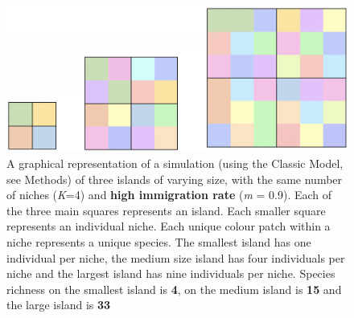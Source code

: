 \begin{figure}[htp]

\centering
\includegraphics[width=.5\textwidth]{HighImIslands.png}\hfill


\caption{A graphical representation of a simulation (using the Classic Model, see Methods) of three islands of varying size, with the same number of niches (\textit{K}=4) and \textbf{high immigration rate} (\textit{m} = 0.9). Each of the three main squares represents an island. Each smaller square represents an individual niche. Each unique colour patch within a niche represents a unique species. The smallest island has one individual per niche, the medium size island has four individuals per niche and the largest island has nine individuals per niche. Species richness on the smallest island is \textbf{4}, on the medium island is \textbf{15} and the large island is \textbf{33}}
\label{fig:figure3}

\end{figure}

